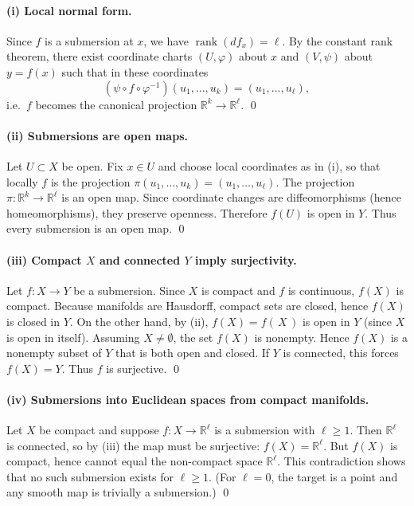 \documentclass[12pt,a4paper]{article}
\theoremstyle{plain}
\theoremstyle{definition}      %
\begin{document}
\paragraph{(i) Local normal form.}
Since $f$ is a submersion at $x$, we have $\operatorname{rank}(df_x)=\ell$.
By the constant rank theorem, there exist coordinate charts $(U,\varphi)$ about $x$ and $(V,\psi)$ about $y=f(x)$
such that in these coordinates
\[
(\psi\circ f\circ \varphi^{-1})(u_1,\dots,u_k)=(u_1,\dots,u_\ell),
\]
i.e.\ $f$ becomes the canonical projection $\mathbb{R}^k\to\mathbb{R}^\ell$.
\qed

\paragraph{(ii) Submersions are open maps.}
Let $U\subset X$ be open. Fix $x\in U$ and choose local coordinates as in (i), so that locally $f$ is the projection
$\pi(u_1,\dots,u_k)=(u_1,\dots,u_\ell)$. The projection $\pi:\mathbb{R}^k\to\mathbb{R}^\ell$ is an open map.
Since coordinate changes are diffeomorphisms (hence homeomorphisms), they preserve openness. Therefore $f(U)$ is open in $Y$.
Thus every submersion is an open map.
\qed

\paragraph{(iii) Compact $X$ and connected $Y$ imply surjectivity.}
Let $f:X\to Y$ be a submersion. Since $X$ is compact and $f$ is continuous, $f(X)$ is compact.
Because manifolds are Hausdorff, compact sets are closed, hence $f(X)$ is closed in $Y$.
On the other hand, by (ii), $f(X)=f(\,X\,)$ is open in $Y$ (since $X$ is open in itself).
Assuming $X\neq\emptyset$, the set $f(X)$ is nonempty. Hence $f(X)$ is a nonempty subset of $Y$ that is both open and closed.
If $Y$ is connected, this forces $f(X)=Y$. Thus $f$ is surjective.
\qed

\paragraph{(iv) Submersions into Euclidean spaces from compact manifolds.}
Let $X$ be compact and suppose $f:X\to\mathbb{R}^\ell$ is a submersion with $\ell\ge 1$.
Then $\mathbb{R}^\ell$ is connected, so by (iii) the map must be surjective: $f(X)=\mathbb{R}^\ell$.
But $f(X)$ is compact, hence cannot equal the non-compact space $\mathbb{R}^\ell$.
This contradiction shows that no such submersion exists for $\ell\ge 1$.
(For $\ell=0$, the target is a point and any smooth map is trivially a submersion.)
\qed
\end{document}
